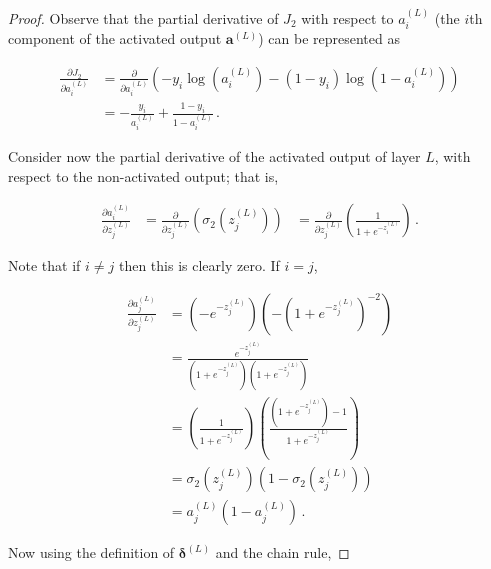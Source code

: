 \documentclass{article}[11pt]
\begin{document}
        \begin{proof}
            
            Observe that the partial derivative of $J_2$ with respect to $a^{(L)}_i$ (the $i$th component of the activated output $\mathbf{a}^{(L)}$) can be represented as
                    
            $$ \begin{aligned}
            \frac{\partial J_2}{\partial a^{(L)}_i}
            &= \frac{\partial}{\partial a^{(L)}_i} \left( - y_i \log(a^{(L)}_i) - (1 - y_i) \log(1 - a^{(L)}_i) \right) \\
            &= - \frac{y_i}{a^{(L)}_i} + \frac{1 - y_i}{1 - a^{(L)}_i} \,.
            \end{aligned} $$
            
            Consider now the partial derivative of the activated output of layer $L$, with respect to the non-activated output; that is,
            
            $$ \begin{aligned}
            \frac{\partial a^{(L)}_i}{\partial z^{(L)}_j}
            &= \frac{\partial}{\partial z^{(L)}_j} \left( \sigma_2(z^{(L)}_j) \right)
            &= \frac{\partial}{\partial z^{(L)}_j} \left( \frac{1}{1 + e^{-z^{(L)}_i}} \right) \,.
            \end{aligned} $$
                
            Note that if $i \neq j$ then this is clearly zero. If $i = j$,
            
            $$ \begin{aligned}
            \frac{\partial a^{(L)}_j}{\partial z^{(L)}_j}
            &= \left( - e^{-z^{(L)}_j} \right) \left( - \left( 1 + e^{-z^{(L)}_j} \right)^{-2} \right) \\
            &= \frac{e^{-z^{(L)}_j}}{\left( 1 + e^{-z^{(L)}_j} \right) \left( 1 + e^{-z^{(L)}_j} \right)} \\
            &= \left( \frac{1}{1 + e^{-z^{(L)}_j}} \right) \left( \frac{\left( 1 + e^{-z^{(L)}_j} \right) - 1}{1 + e^{-z^{(L)}_j}} \right) \\
            &= \sigma_2(z^{(L)}_j) \left( 1 - \sigma_2(z^{(L)}_j) \right) \\
            &= a^{(L)}_j \left( 1 - a^{(L)}_j \right) \,.
            \end{aligned} $$
            
            Now using the definition of $\boldsymbol{\delta}^{(L)}$ and the chain rule,
            

\end{proof}
\end{document}
